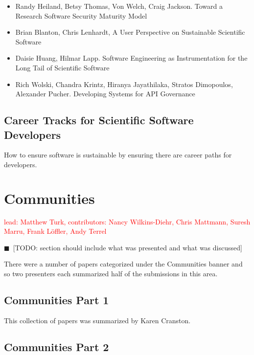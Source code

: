 \documentclass[11pt, oneside]{amsart}
\newcommand{\todo}[1]{{\color{blue}$\blacksquare$~\textsf{[TODO: #1]}}}
\newcommand{\note}[1]{ {\textcolor{red}    { #1 }}}
\begin{document}
\begin{itemize}

\item Randy Heiland, Betsy Thomas, Von Welch, Craig Jackson. Toward a
  Research Software Security Maturity Model \cite{Heiland_WSSSPE}

\item Brian Blanton, Chris Lenhardt, A User Perspective on Sustainable
  Scientific Software \cite{Blanton_WSSSPE}

\item Daisie Huang, Hilmar Lapp. Software Engineering as
  Instrumentation for the Long Tail of Scientific Software
  \cite{Huang_WSSSPE}

\item Rich Wolski, Chandra Krintz, Hiranya Jayathilaka, Stratos
  Dimopoulos, Alexander Pucher. Developing Systems for API Governance
  \cite{Wolski_WSSSPE}

\end{itemize}


\subsection{Career Tracks for Scientific Software Developers}

How to ensure software is sustainable by ensuring there are career
paths for developers.

\section{Communities} \label{sec:community}

\note{lead: Matthew Turk, contributors: Nancy Wilkins-Diehr, Chris Mattmann, Suresh Marru, Frank L\"{o}ffler, Andy Terrel}

\todo{section should include what was presented and what was discussed}

There were a number of papers categorized under the Communities banner and so two presenters each summarized half of the submissions in this area.

\subsection{Communities Part 1}

This collection of papers was summarized by Karen Cranston.

\subsection{Communities Part 2}
\end{document}
